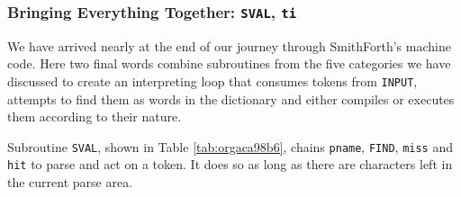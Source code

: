 \documentclass[a4paper,12pt,final]{article}
\begin{document}
\subsubsection{Bringing Everything Together: \texttt{SVAL}, \texttt{ti}}
\label{sec:orga6fd056}

We have arrived nearly at the end of our journey through SmithForth's
machine code.  Here two final words combine subroutines from the five
categories we have discussed to create an interpreting loop that
consumes tokens from \texttt{INPUT}, attempts to find them as words in the
dictionary and either compiles or executes them according to their
nature.

Subroutine \texttt{SVAL}, shown in Table \ref{tab:orgaca98b6}, chains \texttt{pname},
\texttt{FIND}, \texttt{miss} and \texttt{hit} to parse and act on a token.  It does so as
long as there are characters left in the current parse area.
\end{document}
